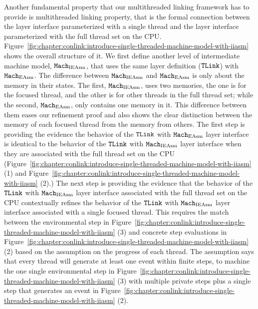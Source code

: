 Another fundamental property that our multithreaded linking framework has to provide is multithreaded linking property, that is the formal connection 
between the layer interface parameterized with a single thread and 
the layer interface parameterized with the full thread set on the CPU.
Figure~\ref{fig:chapter:conlink:introduce-single-threaded-machine-model-with-iiasm} shows the overall structure
of it.
We first define another level of intermediate machine model, ${\mathrm{\texttt{Mach}}}_{\mathrm{IEAsm}}$, that uses the same layer definition (${{\mathrm{\texttt{TLink}}}}$) with ${\mathrm{\texttt{Mach}}}_{\mathrm{EAsm}}$.
The difference between  ${\mathrm{\texttt{Mach}}}_{\mathrm{IEAsm}}$ and  ${\mathrm{\texttt{Mach}}}_{\mathrm{EAsm}}$ is only about the memory in their states. 
The first, ${\mathrm{\texttt{Mach}}}_{\mathrm{IEAsm}}$, uses two memories, the one is for the focused thread, and the other is for other threads in the full thread set; while the second, ${\mathrm{\texttt{Mach}}}_{\mathrm{EAsm}}$, only contains one memory in it. 
This difference between them eases our refinement proof and also shows the clear distinction between the memory of each focused thread from the memory from others. 
The first step is providing the evidence
the behavior of the ${{\mathrm{\texttt{TLink}}}}$ with ${\mathrm{\texttt{Mach}}}_{\mathrm{EAsm}}$ layer interface is identical
to the   behavior of the ${{\mathrm{\texttt{TLink}}}}$ with ${\mathrm{\texttt{Mach}}}_{\mathrm{IEAsm}}$ layer interface when they are associated with the full thread set on the CPU
(Figure~\ref{fig:chapter:conlink:introduce-single-threaded-machine-model-with-iiasm}  (1) and 
Figure~\ref{fig:chapter:conlink:introduce-single-threaded-machine-model-with-iiasm}  (2).)
The next step is 
providing the evidence that 
the behavior of the ${{\mathrm{\texttt{TLink}}}}$ with ${\mathrm{\texttt{Mach}}}_{\mathrm{IEAsm}}$ layer interface associated with the full thread set on the CPU
contextually refines
the behavior of the ${{\mathrm{\texttt{TLink}}}}$ with ${\mathrm{\texttt{Mach}}}_{\mathrm{IEAsm}}$ layer interface associated with a single focused thread.
This requires the match between the environmental step in Figure~\ref{fig:chapter:conlink:introduce-single-threaded-machine-model-with-iiasm}  (3) and concrete step evaluations in  Figure~\ref{fig:chapter:conlink:introduce-single-threaded-machine-model-with-iiasm}  (2)
based on the assumption on the progress of each thread. 
The assumption says that 
every thread will generate at least one event within finite steps,
to machine the one single environmental step in Figure~\ref{fig:chapter:conlink:introduce-single-threaded-machine-model-with-iiasm}  (3)  with multiple private steps plus a single step that generates an event in  Figure~\ref{fig:chapter:conlink:introduce-single-threaded-machine-model-with-iiasm}  (2).

